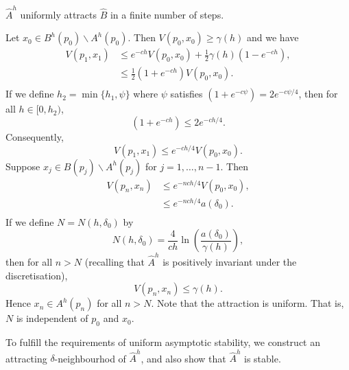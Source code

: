 \begin{lemma}[A4]
$\hat{A}^h$ uniformly attracts $\hat{B}$ in a finite number of steps.
\end{lemma}
\begin{prf}
Let $x_0 \in B^h(p_0)\backslash A^h(p_0)$. Then $V(p_0, x_0) \geq \gamma(h)$ and
we have
\begin{align*}
  V(p_1, x_1) &\leq e^{-ch} V(p_0, x_0) + \frac{1}{2} \gamma(h) (1 -
    e^{-ch}), \\
  &\leq \frac{1}{2}(1 + e^{-ch}) V(p_0, x_0). \\
\end{align*}
If we define $h_2 = \min\{h_1, \psi \}$ where $\psi$ satisfies $(1 +
e^{-c\psi}) = 2e^{-c\psi/4}$, then for all $h \in [0, h_2)$,
\[ (1 + e^{-ch}) \leq 2e^{-ch/4}. \]
Consequently,
\[ V(p_1, x_1) \leq e^{-ch/4} V(p_0, x_0). \]
Suppose $x_j \in B(p_j)\backslash A^h(p_j)$ for $j = 1, \dots, n-1$. Then
\begin{align*}
  V(p_n, x_n) &\leq e^{-nch/4} V(p_0, x_0), \\
  &\leq e^{-nch/4} a(\delta_0). \\
\end{align*}
If we define $N = N(h, \delta_0)$ by
\[ N(h, \delta_0) = \frac{4}{ch} \ln \left( \frac{a(\delta_0)}{\gamma(h)}
    \right), \]
then for all $n > N$ (recalling that $\hat{A}^h$ is positively invariant under
the discretisation),
\[ V(p_n, x_n) \leq \gamma(h). \]
Hence $x_n \in A^h(p_n)$ for all $n > N$. Note that the attraction
is uniform. That is, $N$ is independent of $p_0$ and $x_0$.
\end{prf}

To fulfill the requirements of uniform asymptotic stability, we
construct an attracting $\delta$-neighbourhod of $\hat{A}^h$, and
also show that $\hat{A}^h$ is stable.

